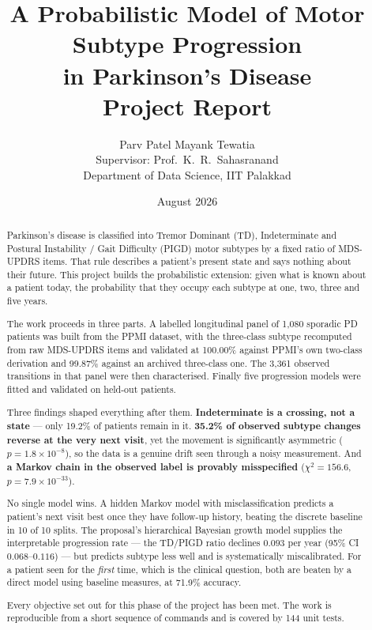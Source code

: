 \documentclass[11pt,a4paper]{article}
\title{\textbf{A Probabilistic Model of Motor Subtype Progression\\
       in Parkinson's Disease}\\[0.7em]
       \large Project Report}
\author{Parv Patel \quad\textbullet\quad Mayank Tewatia\\[0.4em]
        \small Supervisor: Prof.\ K.~R.\ Sahasranand\\
        \small Department of Data Science, IIT Palakkad}
\date{August 2026}
\begin{document}
\maketitle

\begin{abstract}
\noindent
Parkinson's disease is classified into Tremor Dominant (TD), Indeterminate and
Postural Instability / Gait Difficulty (PIGD) motor subtypes by a fixed ratio of
MDS-UPDRS items. That rule describes a patient's present state and says nothing
about their future. This project builds the probabilistic extension: given what
is known about a patient today, the probability that they occupy each subtype at
one, two, three and five years.

The work proceeds in three parts. A labelled longitudinal panel of 1{,}080
sporadic PD patients was built from the PPMI dataset, with the three-class
subtype recomputed from raw MDS-UPDRS items and validated at 100.00\% against
PPMI's own two-class derivation and 99.87\% against an archived three-class one.
The 3{,}361 observed transitions in that panel were then characterised. Finally
five progression models were fitted and validated on held-out patients.

Three findings shaped everything after them. \textbf{Indeterminate is a crossing,
not a state} --- only 19.2\% of patients remain in it. \textbf{35.2\% of observed
subtype changes reverse at the very next visit}, yet the movement is
significantly asymmetric ($p = 1.8 \times 10^{-8}$), so the data is a genuine
drift seen through a noisy measurement. And \textbf{a Markov chain in the observed
label is provably misspecified} ($\chi^2 = 156.6$, $p = 7.9 \times 10^{-33}$).

No single model wins. A hidden Markov model with misclassification predicts a
patient's next visit best once they have follow-up history, beating the discrete
baseline in 10 of 10 splits. The proposal's hierarchical Bayesian growth model
supplies the interpretable progression rate --- the TD/PIGD ratio declines
$0.093$ per year (95\% CI $0.068$--$0.116$) --- but predicts subtype less well
and is systematically miscalibrated. For a patient seen for the \emph{first}
time, which is the clinical question, both are beaten by a direct model using
baseline measures, at 71.9\% accuracy.

Every objective set out for this phase of the project has been met. The work is
reproducible from a short sequence of commands and is covered by 144 unit tests.
\end{abstract}
\end{document}
